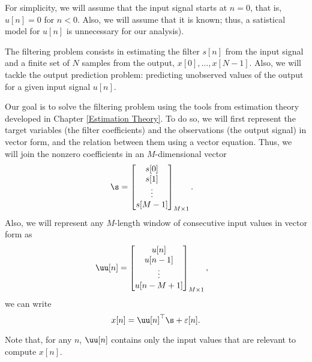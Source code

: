 For simplicity, we will assume that the input signal starts at $n=0$, that is, $u[n]=0$ for $n<0$. Also, we will assume that it is known; thus, a satistical model for $u[n]$ is unnecessary for our analysis).

The filtering problem consists in estimating the filter $s[n]$ from the input signal and a finite set of $N$ samples from the output, $x[0],\ldots, x[N-1]$. Also, we will tackle the output prediction problem: predicting unobserved values of the output for a given input signal $u[n]$.

Our goal is to solve the filtering problem using the tools from estimation theory developed in Chapter \ref{Estimation Theory}. To do so, we will first represent the target variables (the filter coefficients) and the observations (the output signal) in vector form, and the relation between them using a vector equation. Thus, we will join the nonzero coefficients in an $M$-dimensional vector
\begin{align}
\s &= \begin{bmatrix}
		s[0] \\ s[1] \\ \vdots \\ s[M-1]
      \end{bmatrix}_{M\times 1}.
\end{align}
Also, we will represent any $M$-length window of consecutive input values in vector form as
\begin{align}
\uu[n] &= \begin{bmatrix}
   	    	  u[n] \\ u[n-1] \\ \vdots \\ u[n-M+1]
          \end{bmatrix}_{M\times 1},
\end{align}
we can write
\begin{equation}
\label{eq:signal_model}
x[n] = \uu[n]^\top \s + \varepsilon[n].
\end{equation}

Note that, for any $n$, $\uu[n]$ contains only the input values that are relevant to compute $x[n]$.

